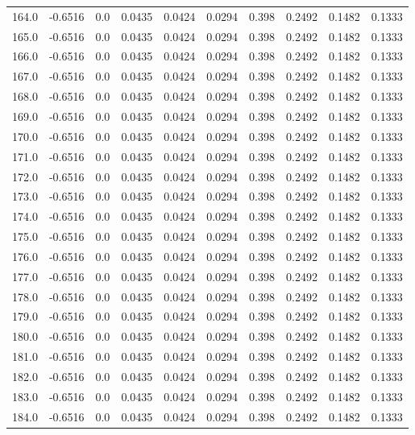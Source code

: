 \begin{longtable}{lrrrrrrrrr}
164.0 & -0.6516 & 0.0 & 0.0435 & 0.0424 & 0.0294 & 0.398 & 0.2492 & 0.1482 & 0.1333 \\
165.0 & -0.6516 & 0.0 & 0.0435 & 0.0424 & 0.0294 & 0.398 & 0.2492 & 0.1482 & 0.1333 \\
166.0 & -0.6516 & 0.0 & 0.0435 & 0.0424 & 0.0294 & 0.398 & 0.2492 & 0.1482 & 0.1333 \\
167.0 & -0.6516 & 0.0 & 0.0435 & 0.0424 & 0.0294 & 0.398 & 0.2492 & 0.1482 & 0.1333 \\
168.0 & -0.6516 & 0.0 & 0.0435 & 0.0424 & 0.0294 & 0.398 & 0.2492 & 0.1482 & 0.1333 \\
169.0 & -0.6516 & 0.0 & 0.0435 & 0.0424 & 0.0294 & 0.398 & 0.2492 & 0.1482 & 0.1333 \\
170.0 & -0.6516 & 0.0 & 0.0435 & 0.0424 & 0.0294 & 0.398 & 0.2492 & 0.1482 & 0.1333 \\
171.0 & -0.6516 & 0.0 & 0.0435 & 0.0424 & 0.0294 & 0.398 & 0.2492 & 0.1482 & 0.1333 \\
172.0 & -0.6516 & 0.0 & 0.0435 & 0.0424 & 0.0294 & 0.398 & 0.2492 & 0.1482 & 0.1333 \\
173.0 & -0.6516 & 0.0 & 0.0435 & 0.0424 & 0.0294 & 0.398 & 0.2492 & 0.1482 & 0.1333 \\
174.0 & -0.6516 & 0.0 & 0.0435 & 0.0424 & 0.0294 & 0.398 & 0.2492 & 0.1482 & 0.1333 \\
175.0 & -0.6516 & 0.0 & 0.0435 & 0.0424 & 0.0294 & 0.398 & 0.2492 & 0.1482 & 0.1333 \\
176.0 & -0.6516 & 0.0 & 0.0435 & 0.0424 & 0.0294 & 0.398 & 0.2492 & 0.1482 & 0.1333 \\
177.0 & -0.6516 & 0.0 & 0.0435 & 0.0424 & 0.0294 & 0.398 & 0.2492 & 0.1482 & 0.1333 \\
178.0 & -0.6516 & 0.0 & 0.0435 & 0.0424 & 0.0294 & 0.398 & 0.2492 & 0.1482 & 0.1333 \\
179.0 & -0.6516 & 0.0 & 0.0435 & 0.0424 & 0.0294 & 0.398 & 0.2492 & 0.1482 & 0.1333 \\
180.0 & -0.6516 & 0.0 & 0.0435 & 0.0424 & 0.0294 & 0.398 & 0.2492 & 0.1482 & 0.1333 \\
181.0 & -0.6516 & 0.0 & 0.0435 & 0.0424 & 0.0294 & 0.398 & 0.2492 & 0.1482 & 0.1333 \\
182.0 & -0.6516 & 0.0 & 0.0435 & 0.0424 & 0.0294 & 0.398 & 0.2492 & 0.1482 & 0.1333 \\
183.0 & -0.6516 & 0.0 & 0.0435 & 0.0424 & 0.0294 & 0.398 & 0.2492 & 0.1482 & 0.1333 \\
184.0 & -0.6516 & 0.0 & 0.0435 & 0.0424 & 0.0294 & 0.398 & 0.2492 & 0.1482 & 0.1333 \\

\end{longtable}
